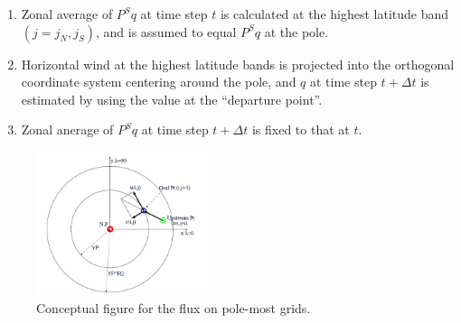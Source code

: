 \begin{enumerate}
\def\labelenumi{\arabic{enumi}.}
\item
  Zonal average of \(P^{S}q\) at time step \(t\) is calculated at the highest latitude band \((j=j_{N},j_{S})\), and is assumed to equal \(P^{S}q\) at the pole.
\item
  Horizontal wind at the highest latitude bands is projected into the orthogonal coordinate system centering around the pole, and \(q\) at time step \(t + \Delta t\) is estimated by using the value at
  the ``departure point''.
\item
  Zonal anerage of \(P^{S}q\) at time step \(t+\Delta t\) is fixed to that at \(t\).
\end{enumerate}

\begin{figure}
\hypertarget{f2}{%
\centering
\includegraphics[width=5cm,height=\textheight]{../figures/polar_tracer_advection.png}
\caption{Conceptual figure for the flux on pole-most grids.}\label{f2}
}
\end{figure}
